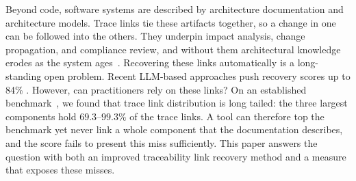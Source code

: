 

Beyond code, software systems are described by architecture documentation and architecture models.
Trace links tie these artifacts together, so a change in one can be followed into the others.
They underpin impact analysis, change propagation, and compliance review, and without them architectural knowledge erodes as the system ages~\cite{gotel1994analysis,clelandhuang2012handbook,maeder2015developers}.
Recovering these links automatically is a long-standing open problem.
Recent \ac{LLM}-based approaches push recovery scores up to 84\% \fone. %
However, can practitioners rely on these links? %
On an established benchmark~\cite{fuchs_establishing_2023}, we found that trace link distribution is long tailed:
the three largest components hold $69.3$--$99.3\%$ of the trace links.
A tool can therefore top the benchmark yet never link a whole component that the documentation describes, and the score fails to present this miss sufficiently. %
This paper answers the question with both an improved traceability link recovery method and a measure that exposes these misses.

